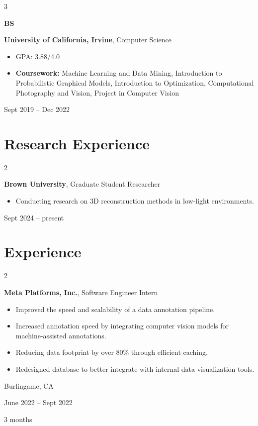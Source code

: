 \documentclass[10pt, letterpaper]{article}
\newenvironment{highlights}{
    \begin{itemize}[
        topsep=0.10 cm,
        parsep=0.10 cm,
        partopsep=0pt,
        itemsep=0pt,
        leftmargin=0.4 cm + 10pt
    ]
}{
    \end{itemize}
} %
\newenvironment{twocolentry}[2][]{
    \onecolentry
    \def\secondColumn{#2}
    \setcolumnwidth{\fill, 4.5 cm}
    \begin{paracol}{2}
}{
    \switchcolumn \raggedleft \secondColumn
    \end{paracol}
    \endonecolentry
} %
\newenvironment{threecolentry}[3][]{
    \onecolentry
    \def\thirdColumn{#3}
    \setcolumnwidth{1 cm, \fill, 4.5 cm}
    \begin{paracol}{3}
    {\raggedright #2} \switchcolumn
}{
    \switchcolumn \raggedleft \thirdColumn
    \end{paracol}
    \endonecolentry
} %
\begin{document}
        \begin{threecolentry}{\textbf{BS}}{
            Sept 2019 – Dec 2022
        }
            \textbf{University of California, Irvine}, Computer Science
            \begin{highlights}
                \item GPA: 3.88/4.0
                \item \textbf{Coursework:} Machine Learning and Data Mining, Introduction to Probabilistic Graphical Models, Introduction to Optimization, Computational Photography and Vision, Project in Computer Vision
            \end{highlights}
        \end{threecolentry}


    
    \section{Research Experience}



        
        \begin{twocolentry}{
            Sept 2024 – present
        }
            \textbf{Brown University}, Graduate Student Researcher
            \begin{highlights}
                \item Conducting research on 3D reconstruction methods in low-light environments.
            \end{highlights}
        \end{twocolentry}



    
    \section{Experience}



        
        \begin{twocolentry}{
            Burlingame, CA

        June 2022 – Sept 2022

        3 months
        }
            \textbf{Meta Platforms, Inc.}, Software Engineer Intern
            \begin{highlights}
                \item Improved the speed and scalability of a data annotation pipeline.
                \item Increased annotation speed by integrating computer vision models for machine-assisted annotations.
                \item Reducing data footprint by over 80\% through efficient caching.
                \item Redesigned database to better integrate with internal data visualization tools.
            \end{highlights}
        \end{twocolentry}
\end{document}
